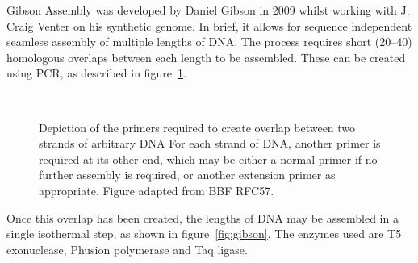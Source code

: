 \documentclass[../main.tex]{subfiles}
\begin{document}
Gibson Assembly was developed by Daniel Gibson\citep{gibson09} in 2009 whilst working with J. Craig Venter on his synthetic genome\citep{venter10}. In brief, it allows for sequence independent seamless assembly of multiple lengths of DNA. The process requires short (\SIrange{20}{40}{\base}) homologous overlaps between each length to be assembled. These can be created using PCR, as described in figure~\ref{fig:gibsonPCR}.
\begin{figure}[p]
\\
\caption[Primer design for Gibson Assembly]{Depiction of the primers required to create overlap between two strands of arbitrary DNA For each strand of DNA, another primer is required at its other end, which may be either a normal primer if no further assembly is required, or another extension primer as appropriate. Figure adapted from BBF RFC57\citep{rfc57}.}
\label{fig:gibsonPCR}
\end{figure}

Once this overlap has been created, the lengths of DNA may be assembled in a single isothermal step, as shown in figure~\ref{fig:gibson}. The enzymes used are T5 exonuclease, Phusion\textregistered\xspace polymerase and Taq ligase. 
\end{document}
